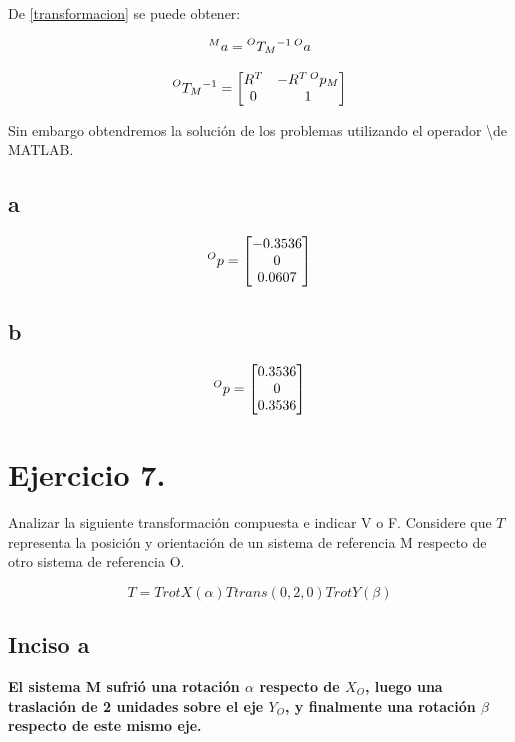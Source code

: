 \documentclass[a4paper,12pt]{article}
\begin{document}
De \cref{transformacion} se puede obtener:

\begin{equation}
    \prescript{M}{}{a} = \prescript{O}{}{T_M}^{-1}\prescript{O}{}{a}
    \label{transformacion inversa}
\end{equation}

\begin{equation}
    \prescript{O}{}{T_M}^{-1} =
    \begin{bmatrix}
        R^T & -R^T\prescript{O}{}{p_M}\\
        0   &   1
    \end{bmatrix}
    \label{matriz homogenea inversa}
\end{equation}

Sin embargo obtendremos la solución de los problemas utilizando el operador \textbackslash de MATLAB.

\subsection{a}
\[
    \prescript{O}{}{p} =
    \begin{bmatrix}
        -0.3536\\
        0      \\
        0.0607
    \end{bmatrix}
\]
\subsection{b}
\[
    \prescript{O}{}{p} =
    \begin{bmatrix}
        0.3536\\
        0     \\
        0.3536
    \end{bmatrix}
\]

\section{Ejercicio 7.}
Analizar la siguiente transformación compuesta e indicar V o F. Considere que $T$
representa la posición y orientación de un sistema de referencia {M} respecto de otro sistema
de referencia {O}.

\[T = TrotX(\alpha) Ttrans(0,2,0) TrotY(\beta)\]

\subsection{Inciso a}
\textbf{El sistema {M} sufrió una rotación $\alpha$ respecto de $X_O$, luego una traslación de 2
unidades sobre el eje $Y_O$, y finalmente una rotación $\beta$ respecto de este mismo eje.}
\vspace*{0.5 cm}
\end{document}
